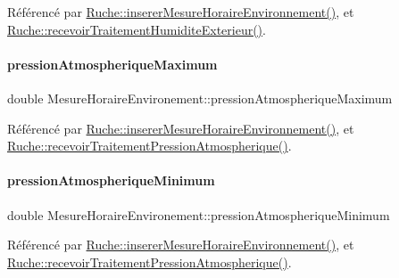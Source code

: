 Référencé par \hyperlink{class_ruche_ac52e79446c5629645e02e27d2a01e56c}{Ruche\+::inserer\+Mesure\+Horaire\+Environnement()}, et \hyperlink{class_ruche_a59e89246b484d7b63851c0ebd20af6c5}{Ruche\+::recevoir\+Traitement\+Humidite\+Exterieur()}.

\mbox{\label{struct_mesure_horaire_environement_a9b82da49ea52c6f118f25433a16e22d4}} 
\paragraph{\texorpdfstring{pression\+Atmospherique\+Maximum}{pressionAtmospheriqueMaximum}}
{\footnotesize\ttfamily double Mesure\+Horaire\+Environement\+::pression\+Atmospherique\+Maximum}



Référencé par \hyperlink{class_ruche_ac52e79446c5629645e02e27d2a01e56c}{Ruche\+::inserer\+Mesure\+Horaire\+Environnement()}, et \hyperlink{class_ruche_aa42daeffa023c83fde40072601e1fa39}{Ruche\+::recevoir\+Traitement\+Pression\+Atmospherique()}.

\mbox{\label{struct_mesure_horaire_environement_a3d42b48772717461f7395cdae5ff925f}} 
\paragraph{\texorpdfstring{pression\+Atmospherique\+Minimum}{pressionAtmospheriqueMinimum}}
{\footnotesize\ttfamily double Mesure\+Horaire\+Environement\+::pression\+Atmospherique\+Minimum}



Référencé par \hyperlink{class_ruche_ac52e79446c5629645e02e27d2a01e56c}{Ruche\+::inserer\+Mesure\+Horaire\+Environnement()}, et \hyperlink{class_ruche_aa42daeffa023c83fde40072601e1fa39}{Ruche\+::recevoir\+Traitement\+Pression\+Atmospherique()}.

